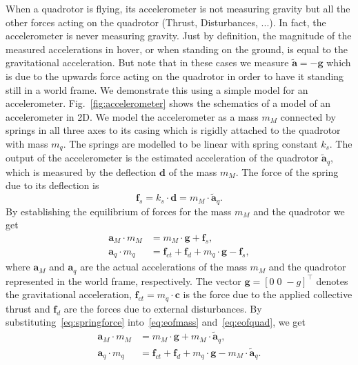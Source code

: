 \documentclass[10pt,a4paper,fleqn]{article}
\newcommand{\bVec}[1]{\mathbf{#1}}
\begin{document}
When a quadrotor is flying, its accelerometer is not measuring gravity but all the other forces acting on the quadrotor (Thrust, Disturbances, ...). 
In fact, the accelerometer is never measuring gravity. 
Just by definition, the magnitude of the measured accelerations in hover, or when standing on the ground, is equal to the gravitational acceleration. 
But note that in these cases we measure $\tilde{\bVec{a}} = -\bVec{g}$ which is due to the upwards force acting on the quadrotor in order to have it standing still in a world frame. 
We demonstrate this using a simple model for an accelerometer. 
Fig.~\ref{fig:accelerometer} shows the schematics of a model of an accelerometer in 2D. 
We model the accelerometer as a mass $m_M$ connected by springs in all three axes to its casing which is rigidly attached to the quadrotor with mass $m_q$. 
The springs are modelled to be linear with spring constant $k_s$. 
The output of the accelerometer is the estimated acceleration of the quadrotor $\tilde{\bVec{a}}_q$, which is measured by the deflection $\bVec{d}$ of the mass $m_M$. 
The force of the spring due to its deflection is
%
\begin{equation}
	\bVec{f}_s = k_s \cdot \bVec{d} = m_M \cdot \tilde{\bVec{a}}_q .
	\label{eq:springforce}
\end{equation}
%
By establishing the equilibrium of forces for the mass $m_M$ and the quadrotor we get
%
\begin{align}
	\bVec{a}_M \cdot m_M &= m_M \cdot \bVec{g} + \bVec{f}_s , \label{eq:eofmass} \\ 
	\bVec{a}_q \cdot m_q &= \bVec{f}_{ct} + \bVec{f}_{d} + m_q \cdot \bVec{g} - \bVec{f}_s , \label{eq:eofquad}
\end{align}
%
where $\bVec{a}_M$ and $\bVec{a}_q$ are the actual accelerations of the mass $m_M$ and the quadrotor represented in the world frame, respectively. 
The vector $\bVec{g} = [0 \; 0 \; -g]^{\top}$ denotes the gravitational acceleration, $\bVec{f}_{ct} = m_q \cdot \bVec{c}$ is the force due to the applied collective thrust and $\bVec{f}_{d}$ are the forces due to external disturbances. 
By substituting~\eqref{eq:springforce} into~\eqref{eq:eofmass} and~\eqref{eq:eofquad}, we get
%
\begin{align}
	\bVec{a}_M \cdot m_M &= m_M \cdot \bVec{g} + m_M \cdot \tilde{\bVec{a}}_q , \label{eq:eofmasssubs} \\
	\bVec{a}_q \cdot m_q &= \bVec{f}_{ct} + \bVec{f}_{d} + m_q \cdot \bVec{g} - m_M \cdot \tilde{\bVec{a}}_q . \label{eq:eofquadsubs}
\end{align}
\end{document}
